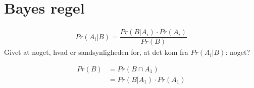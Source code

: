 \documentclass[Main]{subfiles}
\begin{document}


\section{Bayes regel}
\begin{align*}
Pr(A_i|B) = \dfrac{Pr(B|A_i)\cdot Pr(A_i)}{Pr(B)}
\end{align*}
Givet at noget, hvad er sandsynligheden for, at det kom fra $Pr(A_i|B)$: noget?

\begin{align*}
Pr(B) &= Pr(B \cap A_1)\\
	&= Pr(B|A_1)\cdot Pr(A_1)
\end{align*}
\end{document}
